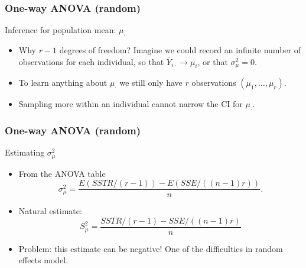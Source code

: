 \documentclass[handout]{beamer}
\begin{document}

   \begin{frame} \frametitle{One-way ANOVA (random)}

   \begin{block}
   {Inference for population mean: $\mu_{\cdot}$}
   \begin{itemize}[<+->]

   \item Why $r-1$ degrees of freedom?
   Imagine we could record an infinite number of observations for each individual, so that $\overline{Y}_{i\cdot} \rightarrow \mu_i$, or that $\sigma^2_{\mu}=0$.

   \item To learn anything about $\mu_{\cdot}$ we still only have $r$ observations
   $(\mu_1, \dots, \mu_r)$.

   \item Sampling more within an individual cannot narrow the CI for $\mu_{\cdot}$.

   \end{itemize}
   \end{block}
   \end{frame}


   \begin{frame} \frametitle{One-way ANOVA (random)}

   \begin{block}
   {Estimating $\sigma^2_{\mu}$}
   \begin{itemize}

   \item From the ANOVA table
   $$
   \sigma^2_{\mu} = \frac{E(SSTR / (r-1)) - E(SSE / ((n-1)r))}{n}.$$

   \item Natural estimate:
   $$
   S^2_{\mu} = \frac{SSTR / (r-1) - SSE / ((n-1)r)}{n}
   $$
   \item Problem: this estimate can be negative! One of the difficulties
   in random effects model.
   \end{itemize}

   \end{block}
   \end{frame}


   \begin{frame} 

   \end{frame}

   
\end{document}
